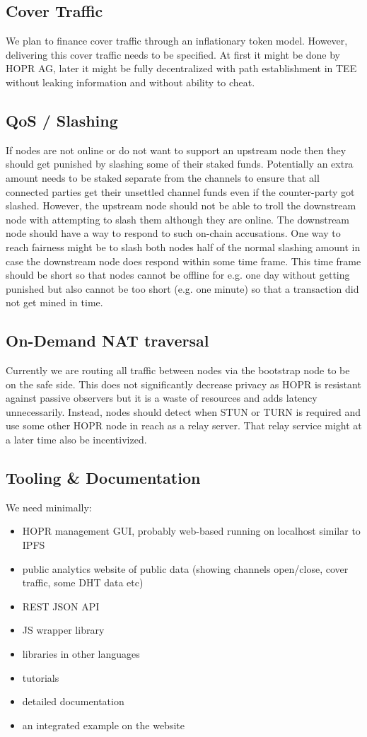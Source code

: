 \documentclass{article}
\begin{document}
\subsection{Cover Traffic}
We plan to finance cover traffic through an inflationary token model. However, delivering this cover traffic needs to be specified. At first it might be done by HOPR AG, later it might be fully decentralized with path establishment in TEE without leaking information and without ability to cheat.

\subsection{QoS / Slashing}
If nodes are not online or do not want to support an upstream node then they should get punished by slashing some of their staked funds. Potentially an extra amount needs to be staked separate from the channels to ensure that all connected parties get their unsettled channel funds even if the counter-party got slashed. However, the upstream node should not be able to troll the downstream node with attempting to slash them although they are online. The downstream node should have a way to respond to such on-chain accusations. One way to reach fairness might be to slash both nodes half of the normal slashing amount in case the downstream node does respond within some time frame. This time frame should be short so that nodes cannot be offline for e.g. one day without getting punished but also cannot be too short (e.g. one minute) so that a transaction did not get mined in time.

\subsection{On-Demand NAT traversal}
Currently we are routing all traffic between nodes via the bootstrap node to be on the safe side. This does not significantly decrease privacy as HOPR is resistant against passive observers but it is a waste of resources and adds latency unnecessarily. Instead, nodes should detect when STUN or TURN is required and use some other HOPR node in reach as a relay server. That relay service might at a later time also be incentivized. 

\subsection{Tooling \& Documentation}
We need minimally:
\begin{itemize}
    \item HOPR management GUI, probably web-based running on localhost similar to IPFS
    \item public analytics website of public data (showing channels open/close, cover traffic, some DHT data etc)
    \item REST JSON API
    \item JS wrapper library
    \item libraries in other languages
    \item tutorials
    \item detailed documentation
    \item an integrated example on the website
\end{itemize}
\end{document}
